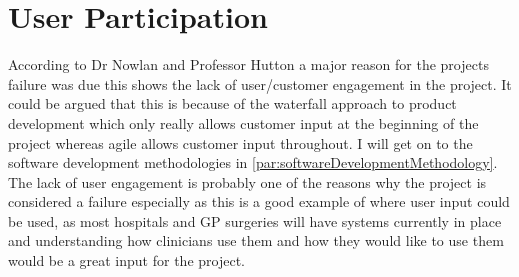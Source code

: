 \documentclass[a4paper,12pt]{scrartcl}
\begin{document}
	\section{User Participation}
	{
		According to Dr Nowlan and Professor Hutton a major reason for the projects failure was due \cite{Commons2007} this shows the lack of user/customer engagement in the project. It could be argued that this is because of the waterfall approach to product development which only really allows customer input at the beginning of the project whereas agile allows customer input throughout. I will get on to the software development methodologies in \cref{par:softwareDevelopmentMethodology}. The lack of user engagement is probably one of the reasons why the project is considered a failure especially as this is a good example of where user input could be used, as most hospitals and GP surgeries will have systems currently in place and understanding how clinicians use them and how they would like to use them would be a great input for the project. 
	}
\end{document}
